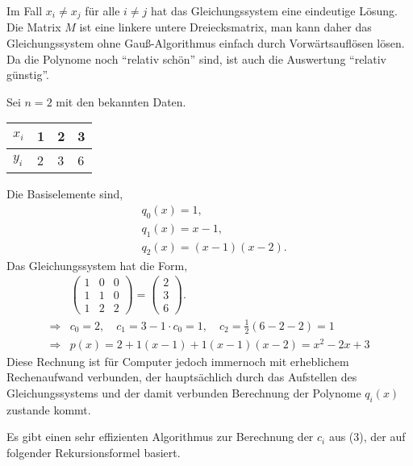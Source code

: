 Im Fall $x_i\neq x_j$ für alle $i\neq j$ hat das Gleichungssystem eine
eindeutige Lösung. Die Matrix $M$ ist eine linkere untere Dreiecksmatrix, man
kann daher das Gleichungssystem ohne Gauß-Algorithmus einfach durch
Vorwärtsauflösen lösen. Da die Polynome noch ``relativ schön'' sind, ist auch
die Auswertung ``relativ günstig''.

\begin{bspn}
Sei $n=2$ mit den bekannten Daten.

\begin{tabular}[h]{l|lll}
$x_i$ & 1 & 2 & 3\\\hline
$y_i$ & 2 & 3 & 6
\end{tabular}

Die Basiselemente sind,
\begin{align*}
&q_0(x) = 1,\\
&q_1(x) = x-1,\\
&q_2(x) = (x-1)(x-2).
\end{align*}
Das Gleichungssystem hat die Form,
\begin{align*}
&\begin{pmatrix}
1 & 0 & 0\\
1 & 1 & 0\\
1 & 2 & 2
\end{pmatrix}
=
\begin{pmatrix}
2 \\ 3 \\ 6
\end{pmatrix}.\\
\Rightarrow & c_0 = 2,\quad c_1 = 3 - 1\cdot c_0 = 1,\quad c_2 =
\frac{1}{2}(6-2-2) = 1\\
\Rightarrow & p(x) = 2 + 1(x-1) + 1(x-1)(x-2) = x^2-2x+3
\end{align*}
Diese Rechnung ist für Computer jedoch immernoch mit erheblichem Rechenaufwand
verbunden, der hauptsächlich durch das Aufstellen des Gleichungssystems und der
damit verbunden Berechnung der Polynome $q_i(x)$ zustande kommt.\bsphere
\end{bspn}

Es gibt einen sehr effizienten Algorithmus zur Berechnung der $c_i$ aus (3),
der auf folgender Rekursionsformel basiert.

